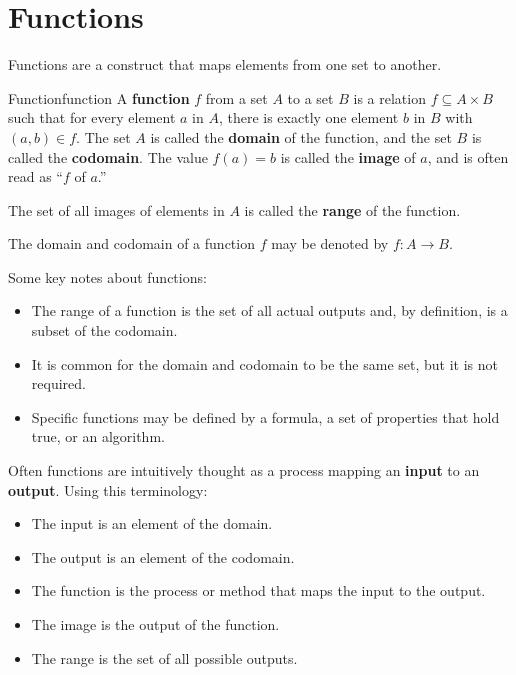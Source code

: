 \section{Functions}

Functions are a construct that maps elements from one set to another.

\begin{definition}{Function}{function}
  A \textbf{function} \( f \) from a set \( A \) to a set \( B \) is a relation 
  \( f \subseteq A \times B \) such that for every element \( a \) in \( A \), 
  there is exactly one element \( b \) in \( B \) with \( (a, b) \in f \). 
  The set \( A \) is called the \textbf{domain} of the function, and the set 
  \( B \) is called the \textbf{codomain}. The value \( f(a) = b \) is called the 
  \textbf{image} of \( a \), and is often read as “\( f \) of \( a \).”

  \medskip

  The set of all images of elements in \( A \) is called the \textbf{range} of 
  the function.

  \medskip

  The domain and codomain of a function \( f \) may be denoted by \( f: A \to B \).
\end{definition}

Some key notes about functions:
\begin{itemize}
  \item The range of a function is the set of all actual outputs and, by 
    definition, is a subset of the codomain.
  \item It is common for the domain and codomain to be the same set, but it is not 
    required.
  \item Specific functions may be defined by a formula, a set of properties that hold true, 
    or an algorithm.
\end{itemize}

Often functions are intuitively thought as a process mapping an \textbf{input} to 
an \textbf{output}. Using this terminology:
\begin{itemize}
  \item The input is an element of the domain.
  \item The output is an element of the codomain.
  \item The function is the process or method that maps the input to the output.
  \item The image is the output of the function.
  \item The range is the set of all possible outputs.
\end{itemize}


